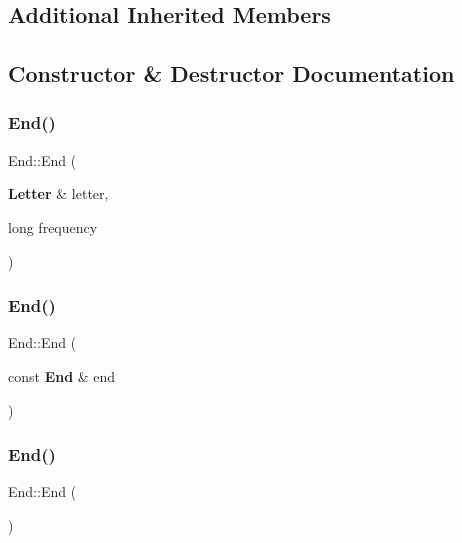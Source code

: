 \subsection*{Additional Inherited Members}


\subsection{Constructor \& Destructor Documentation}
\mbox{\label{class_end_aec010332b2484030781dff4ab47156ce}} 
\subsubsection{End()\hspace{0.1cm}{\footnotesize\ttfamily [1/3]}}
{\footnotesize\ttfamily End\+::\+End (\begin{DoxyParamCaption}\item[{\textbf{ Letter} \&}]{letter,  }\item[{long}]{frequency }\end{DoxyParamCaption})\hspace{0.3cm}{\ttfamily [inline]}}

\mbox{\label{class_end_a9cdb20f0a78b188e13de7c4afc1a0bf4}} 
\subsubsection{End()\hspace{0.1cm}{\footnotesize\ttfamily [2/3]}}
{\footnotesize\ttfamily End\+::\+End (\begin{DoxyParamCaption}\item[{const \textbf{ End} \&}]{end }\end{DoxyParamCaption})\hspace{0.3cm}{\ttfamily [inline]}}

\mbox{\label{class_end_acd25fa8f481c50f5b8eaff4af1159942}} 
\subsubsection{End()\hspace{0.1cm}{\footnotesize\ttfamily [3/3]}}
{\footnotesize\ttfamily End\+::\+End (\begin{DoxyParamCaption}{ }\end{DoxyParamCaption})\hspace{0.3cm}{\ttfamily [inline]}}



